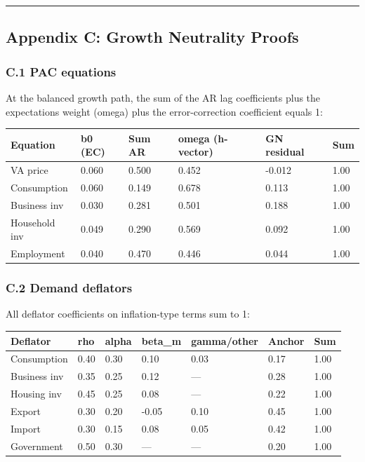 \documentclass[
]{article}
\newcounter{none} %
\begin{document}
\begin{center}\rule{0.5\linewidth}{0.5pt}\end{center}

\subsection{Appendix C: Growth Neutrality
Proofs}\label{appendix-c-growth-neutrality-proofs}

\subsubsection{C.1 PAC equations}\label{c.1-pac-equations}

At the balanced growth path, the sum of the AR lag coefficients plus the
expectations weight (omega) plus the error-correction coefficient equals
1:

{\def\LTcaptype{none} %
\begin{longtable}[]{@{}llllll@{}}
\toprule\noalign{}
Equation & b0 (EC) & Sum AR & omega (h-vector) & GN residual & Sum \\
\midrule\noalign{}
\endhead
\bottomrule\noalign{}
\endlastfoot
VA price & 0.060 & 0.500 & 0.452 & -0.012 & 1.00 \\
Consumption & 0.060 & 0.149 & 0.678 & 0.113 & 1.00 \\
Business inv & 0.030 & 0.281 & 0.501 & 0.188 & 1.00 \\
Household inv & 0.049 & 0.290 & 0.569 & 0.092 & 1.00 \\
Employment & 0.040 & 0.470 & 0.446 & 0.044 & 1.00 \\
\end{longtable}
}

\subsubsection{C.2 Demand deflators}\label{c.2-demand-deflators}

All deflator coefficients on inflation-type terms sum to 1:

{\def\LTcaptype{none} %
\begin{longtable}[]{@{}lllllll@{}}
\toprule\noalign{}
Deflator & rho & alpha & beta\_m & gamma/other & Anchor & Sum \\
\midrule\noalign{}
\endhead
\bottomrule\noalign{}
\endlastfoot
Consumption & 0.40 & 0.30 & 0.10 & 0.03 & 0.17 & 1.00 \\
Business inv & 0.35 & 0.25 & 0.12 & --- & 0.28 & 1.00 \\
Housing inv & 0.45 & 0.25 & 0.08 & --- & 0.22 & 1.00 \\
Export & 0.30 & 0.20 & -0.05 & 0.10 & 0.45 & 1.00 \\
Import & 0.30 & 0.15 & 0.08 & 0.05 & 0.42 & 1.00 \\
Government & 0.50 & 0.30 & --- & --- & 0.20 & 1.00 \\
\end{longtable}
}
\end{document}
